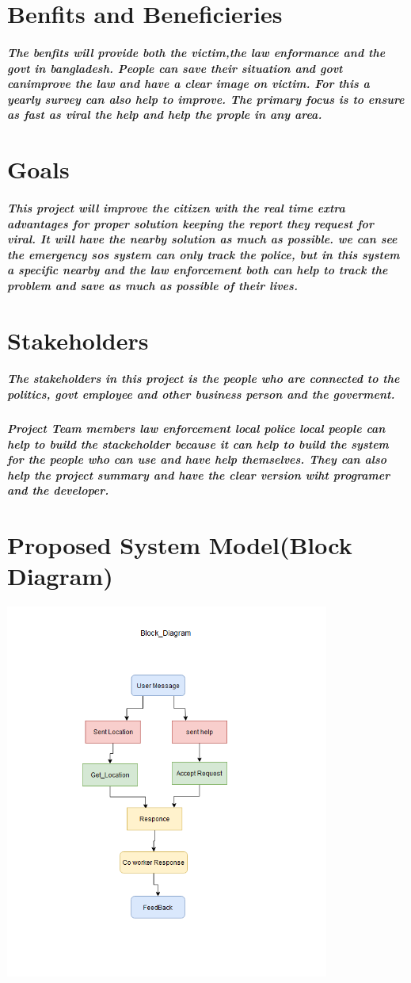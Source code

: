 \documentclass{article}
\begin{document}
\section{Benfits and Beneficieries}
\subparagraph{The benfits will provide both the victim,the law enformance and the govt in bangladesh. People can save their situation and govt canimprove the law and have a clear image on victim. For this a yearly survey can also help to improve. The primary focus is to ensure as fast as viral the help and help the prople in any area.}

\section{Goals}
\subparagraph{This project will improve the citizen with the real time extra advantages for proper solution keeping the report they request for viral. It will have the 
nearby solution as much as possible. we can see the emergency sos system can only track the police, but in this system a specific nearby and the law enforcement both can help to track the problem and save as much as possible of their lives.}


\newpage
\section{Stakeholders}
\subparagraph{The stakeholders in this project is the people who are connected to the politics, govt employee and other business person and 
the goverment.}

\subparagraph{Project Team members law enforcement local police local people can help to build the stackeholder because it can help to build the system for the 
people who can use and have help themselves. They can also help the project summary and have the clear version wiht programer and the developer.
 }

\newpage
\section{Proposed System Model(Block Diagram)}
\includegraphics[width=0.8\textwidth]{Block_Diagram.png}
\end{document}
